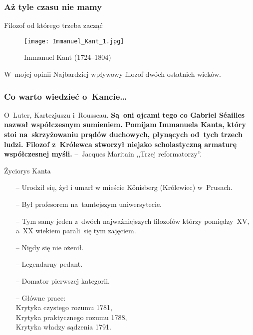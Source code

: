 \documentclass{beamer}  %
\begin{document}
\begin{frame}
  \frametitle{Aż tyle czasu nie mamy}

  \begin{block}{Filozof od którego trzeba zacząć}
    \begin{figure}
      \centering

      \texttt{[image: Immanuel\_Kant\_1.jpg]}
      \caption{Immanuel Kant (1724--1804)}
    \end{figure}
  \end{block}

  \begin{block}{W~mojej opinii}
    \pause Najbardziej wpływowy filozof dwóch ostatnich wieków.
  \end{block}

\end{frame}



\begin{frame}
  \frametitle{Co warto wiedzieć o~Kancie\ldots}

  \begin{block}{O~Luter, Kartezjuszu i~Rousseau.}
    \textbf{Są~oni ojcami tego co Gabriel S\'{e}ailles nazwał
      współczesnym sumieniem. Pomijam Immanuela Kanta, który stoi
      na~skrzyżowaniu prądów duchowych, płynących od~tych trzech
      ludzi. Filozof z~Królewca stworzył niejako scholastyczną
      armaturę współczesnej myśli.} --~Jacques Maritain ,,Trzej
    reformatorzy''.
  \end{block}

  \begin{block}{Życiorys Kanta}
    \begin{itemize}
    \item[--] Urodził się, żył i umarł w mieście K\"{o}nisberg
      (Królewiec) w~Prusach.
    \item[--] Był profesorem na~tamtejszym uniwersytecie.
    \item[--] Tym samy jeden z~dwóch najważniejszych filozofów którzy
      pomiędzy~XV, a~XX wiekiem parali~się tym zajęciem.
    \item[--] Nigdy się nie ożenił.
    \item[--] Legendarny pedant.
    \item[--] Domator pierwszej kategorii.
    \item[--] Główne prace: \\
      Krytyka czystego rozumu 1781, \\
      Krytyka praktycznego rozumu 1788, \\
      Krytyka władzy sądzenia 1791.
    \end{itemize}
  \end{block}

\end{frame}
\end{document}
